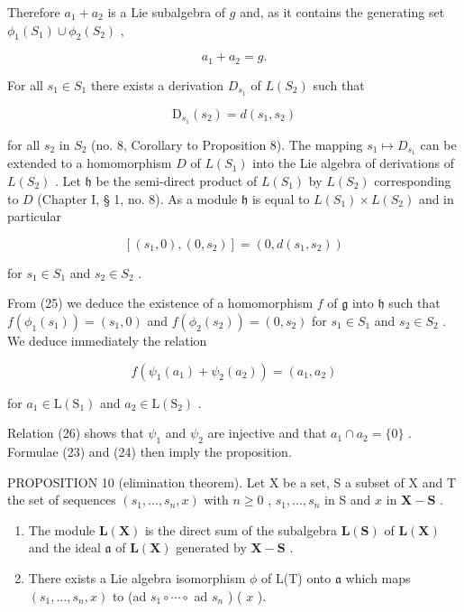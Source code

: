 Therefore \(a_1 + a_2\) is a Lie subalgebra of \(g\) and, as it contains the generating set \(\phi_1(S_1) \cup \phi_2(S_2)\) ,

\[
a _ {1} + a _ {2} = g.\tag{24}
\]

For all \(s_1 \in S_1\) there exists a derivation \(D_{s_1}\) of \(L(S_2)\) such that

\[
\mathrm{D} _ {s _ {1}} (s _ {2}) = d (s _ {1}, s _ {2})
\]

for all \(s_2\) in \(S_2\) (no. 8, Corollary to Proposition 8). The mapping \(s_1 \mapsto D_{s_1}\) can be extended to a homomorphism \(D\) of \(L(S_1)\) into the Lie algebra of derivations of \(L(S_2)\) . Let \(\mathfrak{h}\) be the semi-direct product of \(L(S_1)\) by \(L(S_2)\) corresponding to \(D\) (Chapter I, § 1, no. 8). As a module \(\mathfrak{h}\) is equal to \(L(S_1) \times L(S_2)\) and in particular

\[
[ (s _ {1}, 0), (0, s _ {2}) ] = (0, d (s _ {1}, s _ {2}))\tag{25}
\]

for \(s_{1} \in S_{1}\) and \(s_{2} \in S_{2}\) .

From (25) we deduce the existence of a homomorphism \(f\) of \(\mathfrak{g}\) into \(\mathfrak{h}\) such that \(f(\phi_1(s_1)) = (s_1, 0)\) and \(f(\phi_2(s_2)) = (0, s_2)\) for \(s_1 \in S_1\) and \(s_2 \in S_2\) . We deduce immediately the relation

\[
f (\psi_ {1} (a _ {1}) + \psi_ {2} (a _ {2})) = (a _ {1}, a _ {2})\tag{26}
\]

for \(a_1 \in \mathrm{L}(\mathrm{S}_1)\) and \(a_2 \in \mathrm{L}(\mathrm{S}_2)\) .

Relation (26) shows that \(\psi_{1}\) and \(\psi_{2}\) are injective and that \(a_{1} \cap a_{2} = \{0\}\) . Formulae (23) and (24) then imply the proposition.

PROPOSITION 10 (elimination theorem). Let X be a set, S a subset of X and T the set of sequences \((s_1, \ldots, s_n, x)\) with \(n \geqslant 0\) , \(s_1, \ldots, s_n\) in S and \(x\) in \(\mathbf{X} - \mathbf{S}\) .

\begin{enumerate}
\def\labelenumi{(\alph{enumi})}
\item
  The module \(\mathbf{L}(\mathbf{X})\) is the direct sum of the subalgebra \(\mathbf{L}(\mathbf{S})\) of \(\mathbf{L}(\mathbf{X})\) and the ideal \(\mathfrak{a}\) of \(\mathbf{L}(\mathbf{X})\) generated by \(\mathbf{X} - \mathbf{S}\) .
\item
  There exists a Lie algebra isomorphism \(\phi\) of L(T) onto \(\mathfrak{a}\) which maps \((s_1, \ldots, s_n, x)\) to (ad \(s_1 \circ \cdots \circ\) ad \(s_n\) ) ( \(x\) ).
\end{enumerate}

